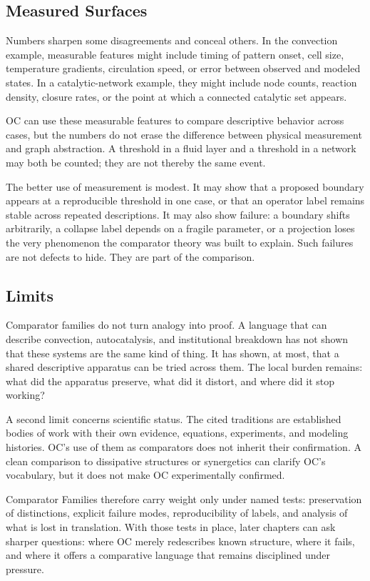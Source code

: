 \documentclass[11pt,a4paper,openany]{book}
\begin{document}
\subsection{Measured Surfaces}
Numbers sharpen some disagreements and conceal others. In the convection example, measurable features might include timing of pattern onset, cell size, temperature gradients, circulation speed, or error between observed and modeled states. In a catalytic-network example, they might include node counts, reaction density, closure rates, or the point at which a connected catalytic set appears. \cite{prigogine_dissipative,haken_synergetics}\par
OC can use these measurable features to compare descriptive behavior across cases, but the numbers do not erase the difference between physical measurement and graph abstraction. A threshold in a fluid layer and a threshold in a network may both be counted; they are not thereby the same event.\par
The better use of measurement is modest. It may show that a proposed boundary appears at a reproducible threshold in one case, or that an operator label remains stable across repeated descriptions. It may also show failure: a boundary shifts arbitrarily, a collapse label depends on a fragile parameter, or a projection loses the very phenomenon the comparator theory was built to explain. Such failures are not defects to hide. They are part of the comparison.\par
\subsection{Limits}
Comparator families do not turn analogy into proof. A language that can describe convection, autocatalysis, and institutional breakdown has not shown that these systems are the same kind of thing. It has shown, at most, that a shared descriptive apparatus can be tried across them. The local burden remains: what did the apparatus preserve, what did it distort, and where did it stop working? \cite{prigogine_dissipative,haken_synergetics}\par
A second limit concerns scientific status. The cited traditions are established bodies of work with their own evidence, equations, experiments, and modeling histories. OC's use of them as comparators does not inherit their confirmation. A clean comparison to dissipative structures or synergetics can clarify OC's vocabulary, but it does not make OC experimentally confirmed.\par
Comparator Families therefore carry weight only under named tests: preservation of distinctions, explicit failure modes, reproducibility of labels, and analysis of what is lost in translation. With those tests in place, later chapters can ask sharper questions: where OC merely redescribes known structure, where it fails, and where it offers a comparative language that remains disciplined under pressure.\par
\end{document}
